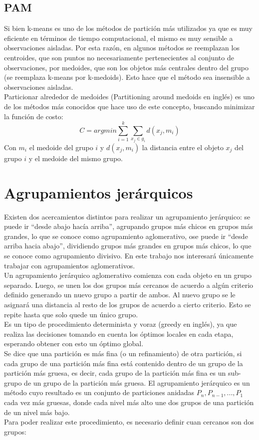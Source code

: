 \subsection{PAM}
Si bien k-means es uno de los métodos de partición más utilizados ya que es muy eficiente en términos de tiempo computacional, el mismo es muy sensible a observaciones aisladas. Por esta razón, en algunos métodos se reemplazan los centroides, que son puntos no necesariamente pertenecientes al conjunto de observaciones, por medoides, que son los objetos más centrales dentro del grupo (se reemplaza k-means por k-medoids). Esto hace que el método sea insensible a observaciones aisladas.\\
Particionar alrededor de medoides (Partitioning around medoids en inglés) es uno de los métodos más conocidos que hace uso de este concepto, buscando minimizar la función de costo:
\begin{equation}
	C = argmin\sum\limits_{i=1}^k \sum\limits_{x_j \in g_i} d(x_j, m_i)
\end{equation}
Con $m_i$ el medoide del grupo $i$ y $d(x_j, m_i)$ la distancia entre el objeto $x_j$ del grupo $i$ y el medoide del mismo grupo.
\cite{Park2009, Ibrahim2012}
\section{Agrupamientos jerárquicos}
Existen dos acercamientos distintos para realizar un agrupamiento jerárquico: se puede ir ``desde abajo hacía arriba'', agrupando grupos más chicos en grupos más grandes, lo que se conoce como agrupamiento aglomerativo, ose puede ir ``desde arriba hacia abajo'', dividiendo grupos más grandes en grupos más chicos, lo que se conoce como agrupamiento divisivo. En este trabajo nos interesará únicamente trabajar con agrupamientos aglomerativos.\\
Un agrupamiento jerárquico aglomerativo comienza con cada objeto en un grupo separado. Luego, se unen los dos grupos más cercanos de acuerdo a algún criterio definido generando un nuevo grupo a partir de ambos. Al nuevo grupo se le asignará una distancia al resto de los grupos de acuerdo a cierto criterio. Esto se repite hasta que solo quede un único grupo.\\
Es un tipo de procedimiento determinista y voraz (greedy en inglés), ya que realiza las decisiones tomando en cuenta los óptimos locales en cada etapa, esperando obtener con esto un óptimo global.\\
Se dice que una partición es más fina (o un refinamiento) de otra partición, si cada grupo de una partición más fina está contenido dentro de un grupo de la partición más gruesa, es decir, cada grupo de la partición más fina es un sub-grupo de un grupo de la partición más gruesa. El agrupamiento jerárquico es un método cuyo resultado es un conjunto de particiones anidadas $P_n, P_{n-1}, ..., P_1$ cada vez más gruesas, donde cada nivel más alto une dos grupos de una partición de un nivel más bajo.\\
Para poder realizar este procedimiento, es necesario definir cuan cercanos son dos grupos:
